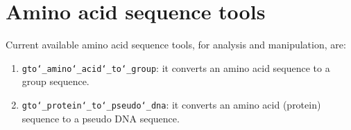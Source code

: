 \chapter{Amino acid sequence tools}
\label{seq}

Current available amino acid sequence tools, for analysis and manipulation, are:
\begin{enumerate}
\item \texttt{gto\char`_amino\char`_acid\char`_to\char`_group}: it converts an amino acid sequence to a group sequence.
\item \texttt{gto\char`_protein\char`_to\char`_pseudo\char`_dna}: it converts an amino acid (protein) sequence to a pseudo DNA sequence.
\end{enumerate}




